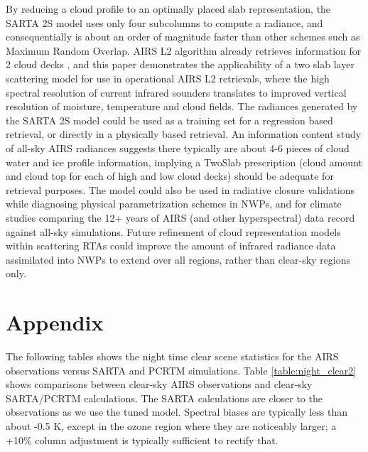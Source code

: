 \documentclass[agupp]{aguplus}              %
\begin{document}
\begin{article}
By reducing a cloud profile
to an optimally placed slab representation, the SARTA 2S model uses
only four subcolumns to compute a radiance, and consequentially is
about an order of magnitude faster than other schemes such as Maximum
Random Overlap. 
AIRS L2 algorithm already retrieves information for 2 cloud decks
\citep{kah:08}, and this paper demonstrates the applicability of a two
slab layer scattering model for use in operational AIRS L2 retrievals,
where the high spectral resolution of current infrared sounders
translates to improved vertical resolution of moisture, temperature
and cloud fields.  The radiances generated by the SARTA 2S model could
be used as a training set for a regression based retrieval, or
directly in a physically based retrieval.  An information content
study of all-sky AIRS radiances suggests there typically are about 4-6
pieces of cloud water and ice profile information, implying a TwoSlab
prescription (cloud amount and cloud top for each of high and low
cloud decks) should be adequate for retrieval purposes. The model
could also be used in radiative closure validations while diagnosing
physical parametrization schemes in NWPs, and for climate studies
comparing the 12+ years of AIRS (and other hyperspectral) data record
against all-sky simulations.  Future refinement of cloud
representation models within scattering RTAs could improve the amount
of infrared radiance data assimilated into NWPs to extend over all
regions, rather than clear-sky regions only.

\section{Appendix} 

The following tables shows the night time clear scene statistics for
the AIRS observations versus SARTA and PCRTM simulations. Table
\ref{table:night_clear2} shows comparisons between clear-sky AIRS observations
and clear-sky SARTA/PCRTM calculations.  The SARTA calculations are
closer to the observations as we use the tuned model.  Spectral biases
are typically less than about -0.5 K, except in the ozone region where
they are noticeably larger; a +10\% column adjustment is typically
sufficient to rectify that.


\end{article}
\end{document}
